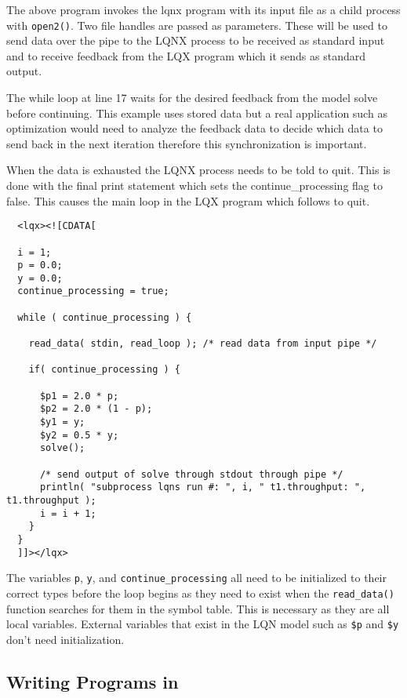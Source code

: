 The above program invokes the lqnx program with its input file as a child process with {\tt open2()}. Two file
handles are passed as parameters. These will be used to send data over the pipe to the LQNX process to be
received as standard input and to receive feedback from the LQX program which it sends as standard output.

The while loop at line 17 waits for the desired feedback from the model solve before continuing. This example
uses stored data but a real application such as optimization would need to analyze the feedback data to decide
which data to send back in the next iteration therefore this synchronization is important.

When the data is exhausted the LQNX process needs to be told to quit. This is done with the final print statement
which sets the continue\_processing flag to false. This causes the main loop in the LQX program which follows to
quit.

\lstset{language=LQX}
\begin{lstlisting}
  <lqx><![CDATA[

  i = 1;
  p = 0.0;
  y = 0.0;
  continue_processing = true;

  while ( continue_processing ) {

    read_data( stdin, read_loop ); /* read data from input pipe */

    if( continue_processing ) {

      $p1 = 2.0 * p;
      $p2 = 2.0 * (1 - p);
      $y1 = y;
      $y2 = 0.5 * y;
      solve();

      /* send output of solve through stdout through pipe */
      println( "subprocess lqns run #: ", i, " t1.throughput: ", t1.throughput );
      i = i + 1;
    }
  }
  ]]></lqx>

\end{lstlisting}

The variables {\tt p}, {\tt y}, and {\tt continue\_processing} all need to be initialized to their correct
types before the loop begins as they need to exist when the {\tt read\_data()} function searches for them
in the symbol table. This is necessary as they are all local variables. External variables that exist in
the LQN model such as {\tt \$p} and {\tt \$y} don't need initialization.


\subsection{Writing Programs in \ModLang}


